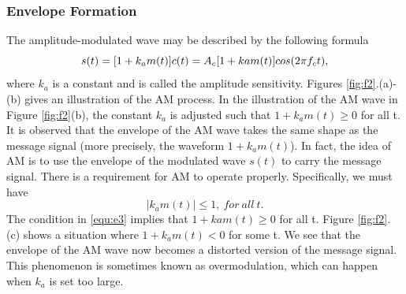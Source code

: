 \subsubsection{Envelope Formation}
The amplitude-modulated wave may be described by the following formula
\begin{equation}
  s(t) = [1 + k_a m(t)] c(t)\\
  = A_c [1 + k a m(t)] cos(2\pi f_c t),
\end{equation}
where $k_a$ is a constant and is called the amplitude sensitivity. Figures \ref{fig:f2}.(a)-(b) gives an illustration
of the AM process. In the illustration of the AM wave in Figure \ref{fig:f2}(b), the constant $k_a$ is adjusted
such that $1 + k_a m(t) \geq 0$ for all t. It is observed that the envelope of the AM wave takes the same
shape as the message signal (more precisely, the waveform $1 + k_a m(t)$). In fact, the idea of AM is
to use the envelope of the modulated wave $s(t)$ to carry the message signal. There is a requirement for AM to operate properly. Specifically, we must have
\begin{equation}
  |k_a m(t)| \leq 1, ~for~ all~ t.
  \label{equ:e3}
\end{equation}
The condition in \ref{equ:e3} implies that $1 + k a m(t) \geq 0$ for all t. Figure \ref{fig:f2}.(c) shows a situation where
$1 + k_a m(t) < 0$ for some t. We see that the envelope of the AM wave now becomes a distorted version of the message signal. This phenomenon is sometimes known as overmodulation, which can
happen when $k_a$ is set too large.


